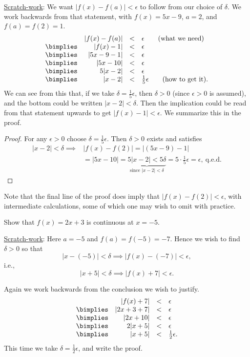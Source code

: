 \qquad\underline{Scratch-work}:  We 
want $|f(x)-f(a)|<\epsilon$ to follow from
our choice of $\delta$.  We work backwards from that statement,
with $f(x)=5x-9$, $a=2$, and $f(a)=f(2)=1$. 
$$\begin{array}{crcl}&|f(x)-f(a)|&<&\epsilon\qquad\text{(what we need)}\\
\bimplies&|f(x)-1|&<&\epsilon\\
\bimplies&|5x-9-1|&<&\epsilon\\
\bimplies&|5x-10|&<&\epsilon\\
\bimplies&5|x-2|&<&\epsilon\\
\bimplies&|x-2|&<&\frac15\epsilon\qquad\text{(how to get it).}\end{array} 
$$
We can see from this that, if we take $\delta=\frac15\epsilon$,
then $\delta>0$ (since $\epsilon>0$ is assumed), and the bottom
could be written $|x-2|<\delta$.  Then the implication could be read
from that statement upwards to get $|f(x)-1|<\epsilon$.
We summarize this in the proof.

\begin{proof} For any $\epsilon>0$ choose $\delta=\frac15\epsilon$.
Then $\delta>0$ exists and satisfies 
\begin{align*}|x-2|<\delta
\implies&|f(x)-f(2)|=|(5x-9)-1|\\ 
&=|5x-10|=\underbrace{5|x-2|<5\delta}_{
\text{since }|x-2|<\delta}=
5\cdot\frac15\epsilon=\epsilon,\mathrm{\ q.e.d.}
\end{align*} 
\end{proof}\eex
Note that the final line of the proof does imply that
$|f(x)-f(2)|<\epsilon$, with intermediate calculations, some of which
one may wish to omit with practice. 


\bex Show that $f(x)=2x+3$ is continuous at $x=-5$.

\qquad \underline{Scratch-work}: Here $a=-5$ and $f(a)=f(-5)=-7$.
Hence we wish to find $\delta>0$ so that
$$|x-(-5)|<\delta\implies|f(x)-(-7)|<\epsilon,$$
i.e.,
$$|x+5|<\delta\implies|f(x)+7|<\epsilon.$$

Again we work backwards from the
conclusion we wish to justify.
$$\begin{array}{crcl}&|f(x)+7|&<&\epsilon\\
\bimplies&|2x+3+7|&<&\epsilon\\
\bimplies&|2x+10|&< &\epsilon\\
\bimplies&2|x+5|&<&\epsilon\\
\bimplies&|x+5|&<&\frac12\epsilon.\end{array}$$ 
This time we take $\delta=\frac12\epsilon$, and write the proof.

